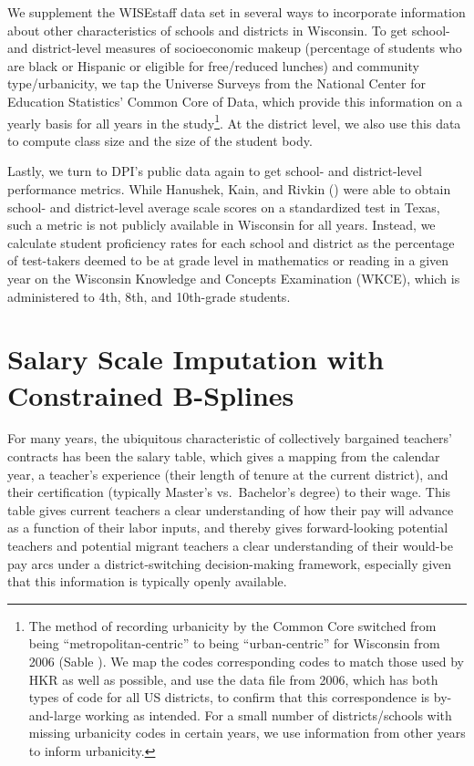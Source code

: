 We supplement the WISEstaff data set in several ways to incorporate
information about other characteristics of schools and districts in
Wisconsin. To get school- and district-level measures of socioeconomic
makeup (percentage of students who are black or Hispanic or eligible for
free/reduced lunches) and community type/urbanicity, we tap the Universe
Surveys from the National Center for Education Statistics' Common Core
of Data, which provide this information on a yearly basis for all years
in the study\footnote{The method of recording urbanicity by the Common
  Core switched from being ``metropolitan-centric'' to being
  ``urban-centric'' for Wisconsin from 2006 (Sable
  \citeyear{sable}). We map the codes corresponding
  codes to match those used by HKR as well as possible, and use the data
  file from 2006, which has both types of code for all US districts, to
  confirm that this correspondence is by-and-large working as intended.
  For a small number of districts/schools with missing urbanicity codes
  in certain years, we use information from other years to inform
  urbanicity.}. At the district level, we also use this data to compute
class size and the size of the student body.

Lastly, we turn to DPI's public data again to get school- and
district-level performance metrics. While Hanushek, Kain, and Rivkin
(\citeyear{hanushek}) were able to obtain school- and
district-level average scale scores on a standardized test in Texas,
such a metric is not publicly available in Wisconsin for all years.
Instead, we calculate student proficiency rates for each school and
district as the percentage of test-takers deemed to be at grade level in
mathematics or reading in a given year on the Wisconsin Knowledge and
Concepts Examination (WKCE), which is administered to 4th, 8th, and
10th-grade students.

\section{Salary Scale Imputation with Constrained
B-Splines}\label{salary-scale-imputation-with-constrained-b-splines}

For many years, the ubiquitous characteristic of collectively bargained
teachers' contracts has been the salary table, which gives a mapping
from the calendar year, a teacher's experience (their length of tenure
at the current district), and their certification (typically Master's
vs.~Bachelor's degree) to their wage. This table gives current teachers
a clear understanding of how their pay will advance as a function of
their labor inputs, and thereby gives forward-looking potential teachers
and potential migrant teachers a clear understanding of their would-be
pay arcs under a district-switching decision-making framework,
especially given that this information is typically openly available.

